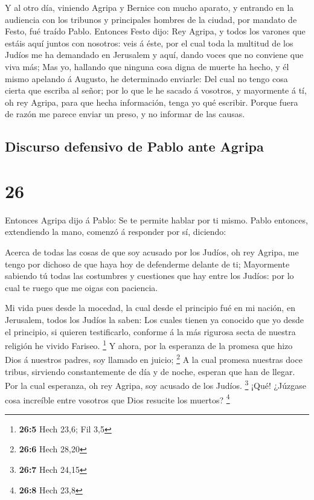  Y al otro día, viniendo Agripa y Bernice con mucho
aparato, y entrando en la audiencia con los tribunos y principales
hombres de la ciudad, por mandato de Festo, fué traído Pablo.
 Entonces Festo dijo: Rey Agripa, y todos los varones que
estáis aquí juntos con nosotros: veis á éste, por el cual toda la
multitud de los Judíos me ha demandado en Jerusalem y aquí, dando voces
que no conviene que viva más;  Mas yo, hallando que
ninguna cosa digna de muerte ha hecho, y él mismo apelando á Augusto, he
determinado enviarle:  Del cual no tengo cosa cierta que
escriba al señor; por lo que le he sacado á vosotros, y mayormente á tí,
oh rey Agripa, para que hecha información, tenga yo qué escribir.
 Porque fuera de razón me parece enviar un preso, y no
informar de las causas.

\hypertarget{discurso-defensivo-de-pablo-ante-agripa}{%
\subsection{Discurso defensivo de Pablo ante
Agripa}\label{discurso-defensivo-de-pablo-ante-agripa}}

\hypertarget{section-25}{%
\section{26}\label{section-25}}

 Entonces Agripa dijo á Pablo: Se te permite hablar por ti
mismo. Pablo entonces, extendiendo la mano, comenzó á responder por sí,
diciendo:

 Acerca de todas las cosas de que soy acusado por los
Judíos, oh rey Agripa, me tengo por dichoso de que haya hoy de
defenderme delante de ti;  Mayormente sabiendo tú todas
las costumbres y cuestiones que hay entre los Judíos: por lo cual te
ruego que me oigas con paciencia.

 Mi vida pues desde la mocedad, la cual desde el principio
fué en mi nación, en Jerusalem, todos los Judíos la saben:
 Los cuales tienen ya conocido que yo desde el principio,
si quieren testificarlo, conforme á la más rigurosa secta de nuestra
religión he vivido Fariseo. \footnote{\textbf{26:5} Hech 23,6; Fil 3,5}
 Y ahora, por la esperanza de la promesa que hizo Dios á
nuestros padres, soy llamado en juicio; \footnote{\textbf{26:6} Hech
  28,20}  A la cual promesa nuestras doce tribus,
sirviendo constantemente de día y de noche, esperan que han de llegar.
Por la cual esperanza, oh rey Agripa, soy acusado de los Judíos.
\footnote{\textbf{26:7} Hech 24,15}  ¡Qué! ¿Júzgase cosa
increíble entre vosotros que Dios resucite los muertos? \footnote{\textbf{26:8}
  Hech 23,8}

